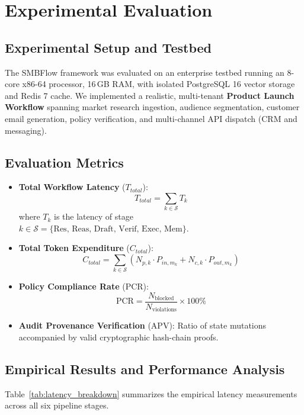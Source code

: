 \documentclass[conference]{IEEEtran}
\begin{document}
\section{Experimental Evaluation}

\subsection{Experimental Setup and Testbed}
The SMBFlow framework was evaluated on an enterprise testbed running an 8-core x86-64 processor, 16\,GB RAM, with isolated PostgreSQL 16 vector storage and Redis 7 cache. We implemented a realistic, multi-tenant \textbf{Product Launch Workflow} spanning market research ingestion, audience segmentation, customer email generation, policy verification, and multi-channel API dispatch (CRM and messaging).

\subsection{Evaluation Metrics}
\begin{itemize}
    \item \textbf{Total Workflow Latency} ($T_{total}$):
    \begin{equation}
    T_{total} = \sum_{k \in \mathcal{S}} T_k
    \end{equation}
    where $T_k$ is the latency of stage $k \in \mathcal{S} = \{\text{Res, Reas, Draft, Verif, Exec, Mem}\}$.
    \item \textbf{Total Token Expenditure} ($C_{total}$):
    \begin{equation}
    C_{total} = \sum_{k \in \mathcal{S}} \left( N_{p, k} \cdot P_{in, m_k} + N_{c, k} \cdot P_{out, m_k} \right)
    \end{equation}
    \item \textbf{Policy Compliance Rate} (PCR):
    \begin{equation}
    \text{PCR} = \frac{N_{\text{blocked}}}{N_{\text{violations}}} \times 100\%
    \end{equation}
    \item \textbf{Audit Provenance Verification} (APV): Ratio of state mutations accompanied by valid cryptographic hash-chain proofs.
\end{itemize}

\subsection{Empirical Results and Performance Analysis}
Table~\ref{tab:latency_breakdown} summarizes the empirical latency measurements across all six pipeline stages.
\end{document}
